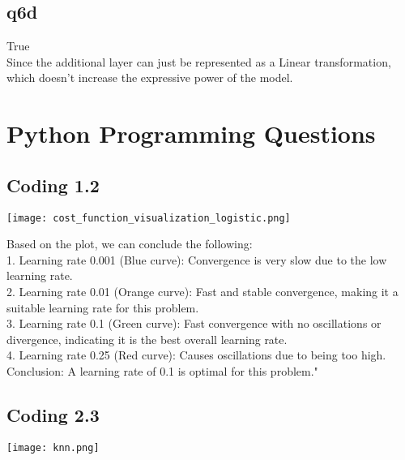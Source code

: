 \documentclass[12pt]{article}
\begin{document}
\newpage
\subsection{q6d}
\begin{tcolorbox}[myblock, title = answer]
  True \\
  Since the additional layer can just be represented as a Linear transformation, which doesn't increase the expressive power of the model. 

  
\end{tcolorbox}





\newpage
\section{Python Programming Questions}
\subsection{Coding 1.2}

\begin{center}
  \texttt{[image: cost\_function\_visualization\_logistic.png]}
\end{center}

Based on the plot, we can conclude the following:\\
1. Learning rate 0.001 (Blue curve): Convergence is very slow due to the low learning rate.\\
2. Learning rate 0.01 (Orange curve): Fast and stable convergence, making it a suitable learning rate for this problem.\\
3. Learning rate 0.1 (Green curve): Fast convergence with no oscillations or divergence, indicating it is the best overall learning rate.\\
4. Learning rate 0.25 (Red curve): Causes oscillations due to being too high.\\

Conclusion: A learning rate of 0.1 is optimal for this problem."

\subsection{Coding 2.3}
\begin{center}
  \texttt{[image: knn.png]}
\end{center}
\end{document}
